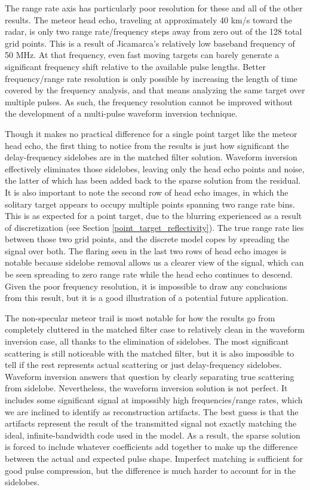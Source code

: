 The range rate axis has particularly poor resolution for these and all of the other results. The meteor head echo, traveling at approximately 40 km/s toward the radar, is only two range rate/frequency steps away from zero out of the 128 total grid points. This is a result of Jicamarca's relatively low baseband frequency of 50 MHz. At that frequency, even fast moving targets can barely generate a significant frequency shift relative to the available pulse lengths. Better frequency/range rate resolution is only possible by increasing the length of time covered by the frequency analysis, and that means analyzing the same target over multiple pulses. As such, the frequency resolution cannot be improved without the development of a multi-pulse waveform inversion technique.

Though it makes no practical difference for a single point target like the meteor head echo, the first thing to notice from the results is just how significant the delay-frequency sidelobes are in the matched filter solution. Waveform inversion effectively eliminates those sidelobes, leaving only the head echo points and noise, the latter of which has been added back to the sparse solution from the residual. It is also important to note the second row of head echo images, in which the solitary target appears to occupy multiple points spanning two range rate bins. This is as expected for a point target, due to the blurring experienced as a result of discretization (see Section \ref{point_target_reflectivity}). The true range rate lies between those two grid points, and the discrete model copes by spreading the signal over both. The flaring seen in the last two rows of head echo images is notable because sidelobe removal allows us a clearer view of the signal, which can be seen spreading to zero range rate while the head echo continues to descend. Given the poor frequency resolution, it is impossible to draw any conclusions from this result, but it is a good illustration of a potential future application.

The non-specular meteor trail is most notable for how the results go from completely cluttered in the matched filter case to relatively clean in the waveform inversion case, all thanks to the elimination of sidelobes. The most significant scattering is still noticeable with the matched filter, but it is also impossible to tell if the rest represents actual scattering or just delay-frequency sidelobes. Waveform inversion answers that question by clearly separating true scattering from sidelobe. Nevertheless, the waveform inversion solution is not perfect. It includes some significant signal at impossibly high frequencies/range rates, which we are inclined to identify as reconstruction artifacts. The best guess is that the artifacts represent the result of the transmitted signal not exactly matching the ideal, infinite-bandwidth code used in the model. As a result, the sparse solution is forced to include whatever coefficients add together to make up the difference between the actual and expected pulse shape. Imperfect matching is sufficient for good pulse compression, but the difference is much harder to account for in the sidelobes.

